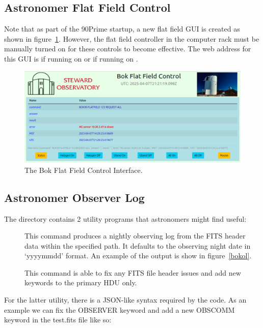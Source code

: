 \documentclass[12pt,twoside]{article}
\begin{document}
\subsection{Astronomer Flat Field Control}
\label{astronomerflatfieldcontrol}
Note that as part of the 90Prime startup, a new flat field GUI is created as shown in figure~\ref{bokff}. However, the
flat field controller in the computer rack must be manually turned on for these controls to become effective. The web
address for this GUI is  if running on  or  if running on .

\begin{figure}[!h]
 \centering
 \includegraphics[width=0.8\linewidth]{bokFlatField.png}
 \caption{The Bok Flat Field Control Interface.}
 \label{bokff}
\end{figure}

\subsection{Astronomer Observer Log}
\label{astronomerobserverlog}

The directory  contains 2 utility programs that astronomers might find useful:

\begin{description}
 \item[] This command produces a nightly observing log from the FITS header data within the specified path. It defaults to the observing night date in `yyyymmdd' format. An example of the output is show in figure~\ref{bokol}.
 \item[] This command is able to fix any FITS file header issues and add new keywords to the primary HDU only.
\end{description}

For the latter utility, there is a JSON-like syntax required by the code. As an example we can fix the OBSERVER keyword and add a new OBSCOMM keyword in the test.fits file like so:
\end{document}

